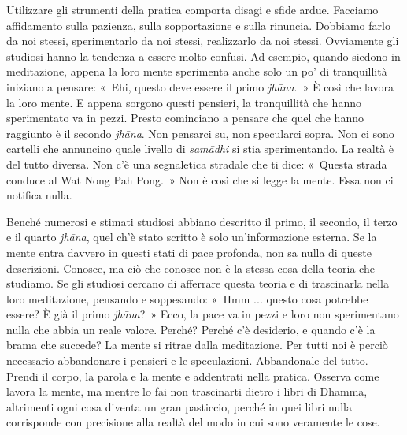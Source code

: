 Utilizzare gli strumenti della pratica comporta disagi e sfide ardue.
Facciamo affidamento sulla pazienza, sulla sopportazione e sulla
rinuncia. Dobbiamo farlo da noi stessi, sperimentarlo da noi stessi,
realizzarlo da noi stessi. Ovviamente gli studiosi hanno la tendenza a
essere molto confusi. Ad esempio, quando siedono in meditazione, appena
la loro mente sperimenta anche solo un po' di tranquillità iniziano a
pensare: «~Ehi, questo deve essere il primo \emph{jhāna}.~» È così che
lavora la loro mente. E appena sorgono questi pensieri, la tranquillità
che hanno sperimentato va in pezzi. Presto cominciano a pensare che quel
che hanno raggiunto è il secondo \emph{jhāna}. Non pensarci su, non
specularci sopra. Non ci sono cartelli che annuncino quale livello di
\emph{samādhi} si stia sperimentando. La realtà è del tutto diversa. Non
c'è una segnaletica stradale che ti dice: «~Questa strada conduce al Wat
Nong Pah Pong.~» Non è così che si legge la mente. Essa non ci notifica
nulla.

Benché numerosi e stimati studiosi abbiano descritto il primo, il
secondo, il terzo e il quarto \emph{jhāna}, quel ch'è stato scritto è
solo un'informazione esterna. Se la mente entra davvero in questi stati
di pace profonda, non sa nulla di queste descrizioni. Conosce, ma ciò
che conosce non è la stessa cosa della teoria che studiamo. Se gli
studiosi cercano di afferrare questa teoria e di trascinarla nella loro
meditazione, pensando e soppesando: «~Hmm ... questo cosa potrebbe
essere? È già il primo \emph{jhāna}?~» Ecco, la pace va in pezzi e loro
non sperimentano nulla che abbia un reale valore. Perché? Perché c'è
desiderio, e quando c'è la brama che succede? La mente si ritrae dalla
meditazione. Per tutti noi è perciò necessario abbandonare i pensieri e
le speculazioni. Abbandonale del tutto. Prendi il corpo, la parola e la
mente e addentrati nella pratica. Osserva come lavora la mente, ma
mentre lo fai non trascinarti dietro i libri di Dhamma, altrimenti ogni
cosa diventa un gran pasticcio, perché in quei libri nulla corrisponde
con precisione alla realtà del modo in cui sono veramente le cose.

